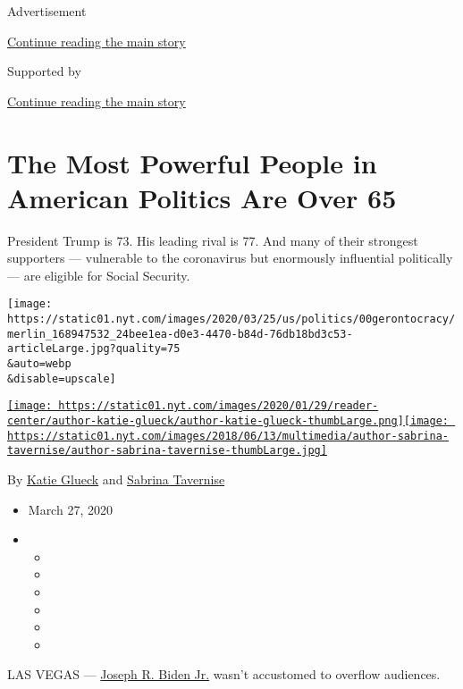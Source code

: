 Advertisement

\protect\hyperlink{after-top}{Continue reading the main story}

Supported by

\protect\hyperlink{after-sponsor}{Continue reading the main story}

\hypertarget{the-most-powerful-people-in-american-politics-are-over-65}{%
\section{The Most Powerful People in American Politics Are Over
65}\label{the-most-powerful-people-in-american-politics-are-over-65}}

President Trump is 73. His leading rival is 77. And many of their
strongest supporters --- vulnerable to the coronavirus but enormously
influential politically --- are eligible for Social Security.

\texttt{[image: https://static01.nyt.com/images/2020/03/25/us/politics/00gerontocracy/merlin\_168947532\_24bee1ea-d0e3-4470-b84d-76db18bd3c53-articleLarge.jpg?quality=75\\\&auto=webp\\\&disable=upscale]}

\href{https://www.nytimes.com/by/katie-glueck}{\texttt{[image: https://static01.nyt.com/images/2020/01/29/reader-center/author-katie-glueck/author-katie-glueck-thumbLarge.png]}}\href{https://www.nytimes.com/by/sabrina-tavernise}{\texttt{[image: https://static01.nyt.com/images/2018/06/13/multimedia/author-sabrina-tavernise/author-sabrina-tavernise-thumbLarge.jpg]}}

By \href{https://www.nytimes.com/by/katie-glueck}{Katie Glueck} and
\href{https://www.nytimes.com/by/sabrina-tavernise}{Sabrina Tavernise}

\begin{itemize}
\item
  March 27, 2020
\item
  \begin{itemize}
  \item
  \item
  \item
  \item
  \item
  \item
  \end{itemize}
\end{itemize}

LAS VEGAS ---
\href{https://www.nytimes.com/interactive/2020/us/elections/joe-biden.html}{Joseph
R. Biden Jr.} wasn't accustomed to overflow audiences.

